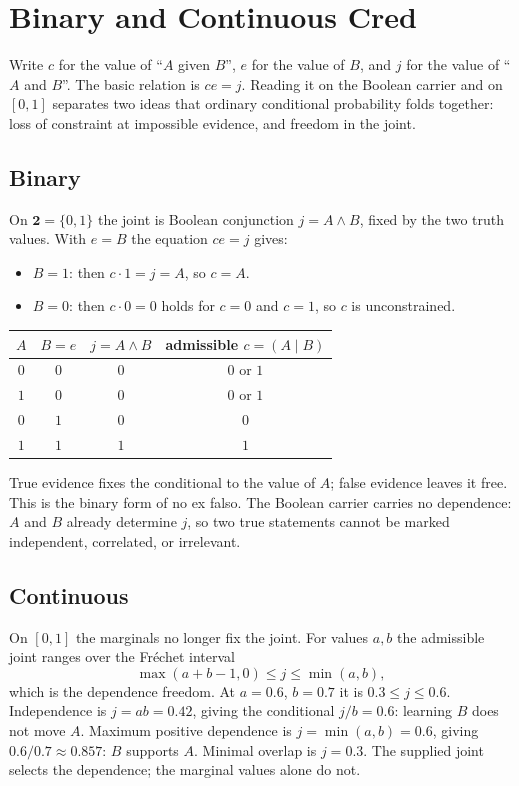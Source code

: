 \documentclass[11pt,a4paper]{article}
\begin{document}
\section{Binary and Continuous Cred}
\label{sec:binary-continuous}

Write $c$ for the value of ``$A$ given $B$'', $e$ for the value of $B$,
and $j$ for the value of ``$A$ and $B$''.  The basic relation is
$ce=j$.  Reading it on the Boolean carrier and on $[0,1]$ separates two
ideas that ordinary conditional probability folds together: loss of
constraint at impossible evidence, and freedom in the joint.

\subsection{Binary}
On $\mathbf 2=\{0,1\}$ the joint is Boolean conjunction $j=A\land B$,
fixed by the two truth values.  With $e=B$ the equation $ce=j$ gives:
\begin{itemize}[nosep]
\item $B=1$: then $c\cdot1=j=A$, so $c=A$.
\item $B=0$: then $c\cdot0=0$ holds for $c=0$ and $c=1$, so $c$ is
unconstrained.
\end{itemize}
\begin{center}
\begin{tabular}{@{}cccc@{}}
\toprule
$A$ & $B=e$ & $j=A\land B$ & admissible $c=(A\mid B)$\\
\midrule
$0$ & $0$ & $0$ & $0$ or $1$\\
$1$ & $0$ & $0$ & $0$ or $1$\\
$0$ & $1$ & $0$ & $0$\\
$1$ & $1$ & $1$ & $1$\\
\bottomrule
\end{tabular}
\end{center}
True evidence fixes the conditional to the value of $A$; false evidence
leaves it free.  This is the binary form of no ex falso.  The Boolean
carrier carries no dependence: $A$ and $B$ already determine $j$, so two
true statements cannot be marked independent, correlated, or irrelevant.

\subsection{Continuous}
On $[0,1]$ the marginals no longer fix the joint.  For values $a,b$ the
admissible joint ranges over the Fr\'echet interval
\[
  \max(a+b-1,0)\le j\le\min(a,b),
\]
which is the dependence freedom.  At $a=0.6$, $b=0.7$ it is
$0.3\le j\le0.6$.  Independence is $j=ab=0.42$, giving the conditional
$j/b=0.6$: learning $B$ does not move $A$.  Maximum positive dependence
is $j=\min(a,b)=0.6$, giving $0.6/0.7\approx0.857$: $B$ supports $A$.
Minimal overlap is $j=0.3$.  The supplied joint selects the dependence;
the marginal values alone do not.
\end{document}
